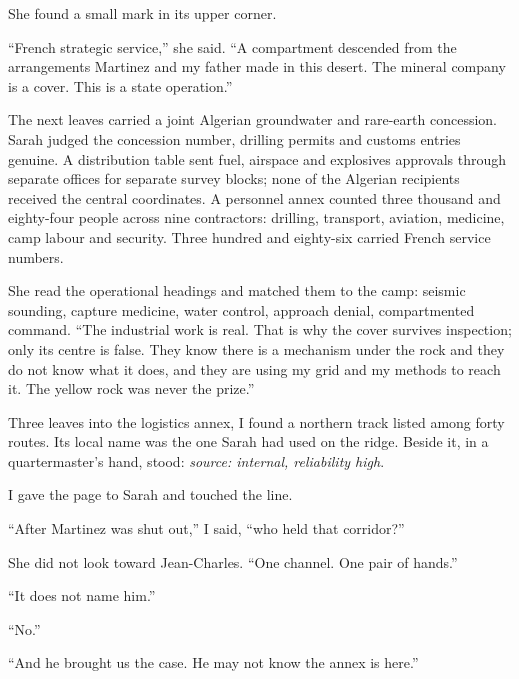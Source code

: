 She found a small mark in its upper corner.\par

``French strategic service,'' she said. ``A compartment descended from the arrangements Martinez and my father made in this desert. The mineral company is a cover. This is a state operation.''\par

The next leaves carried a joint Algerian groundwater and rare-earth concession. Sarah judged the concession number, drilling permits and customs entries genuine. A distribution table sent fuel, airspace and explosives approvals through separate offices for separate survey blocks; none of the Algerian recipients received the central coordinates. A personnel annex counted three thousand and eighty-four people across nine contractors: drilling, transport, aviation, medicine, camp labour and security. Three hundred and eighty-six carried French service numbers.\par

She read the operational headings and matched them to the camp: seismic sounding, capture medicine, water control, approach denial, compartmented command. ``The industrial work is real. That is why the cover survives inspection; only its centre is false. They know there is a mechanism under the rock and they do not know what it does, and they are using my grid and my methods to reach it. The yellow rock was never the prize.''\par

Three leaves into the logistics annex, I found a northern track listed among forty routes. Its local name was the one Sarah had used on the ridge. Beside it, in a quartermaster's hand, stood: \emph{source: internal, reliability high}.\par

I gave the page to Sarah and touched the line.\par

``After Martinez was shut out,'' I said, ``who held that corridor?''\par

She did not look toward Jean-Charles. ``One channel. One pair of hands.''\par

``It does not name him.''\par

``No.''\par

``And he brought us the case. He may not know the annex is here.''\par

